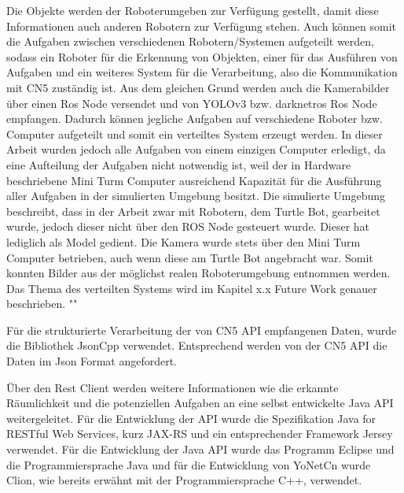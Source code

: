 Die Objekte werden der Roboterumgeben zur Verfügung gestellt, damit diese Informationen auch anderen Robotern zur Verfügung stehen. Auch können somit die Aufgaben zwischen verschiedenen Robotern/Systemen aufgeteilt werden, sodass ein Roboter für die Erkennung von Objekten, einer für das Ausführen von Aufgaben und ein weiteres System für die Verarbeitung, also die Kommunikation mit CN5 zuständig ist. Aus dem gleichen Grund werden auch die Kamerabilder über einen Ros Node versendet und von YOLOv3 bzw. darknetros Ros Node empfangen. Dadurch können jegliche Aufgaben auf verschiedene Roboter bzw. Computer aufgeteilt und somit ein verteiltes System erzeugt werden. In dieser Arbeit wurden jedoch alle Aufgaben von einem einzigen Computer erledigt, da eine Aufteilung der Aufgaben nicht notwendig ist, weil der in Hardware beschriebene Mini Turm Computer ausreichend Kapazität für die Ausführung aller Aufgaben in der simulierten Umgebung besitzt. Die simulierte Umgebung beschreibt, dass in der Arbeit zwar mit Robotern, dem Turtle Bot, gearbeitet wurde, jedoch dieser nicht über den ROS Node gesteuert wurde. Dieser hat lediglich als Model gedient. Die Kamera wurde stets über den Mini Turm Computer betrieben, auch wenn diese am Turtle Bot angebracht war. Somit konnten Bilder aus der möglichst realen Roboterumgebung entnommen werden. Das Thema des verteilten Systems wird im Kapitel x.x Future Work genauer beschrieben. 
""



Für die strukturierte Verarbeitung der von CN5 API empfangenen Daten, wurde die Bibliothek JsonCpp verwendet. Entsprechend werden von der CN5 API die Daten im Json Format angefordert. 

Über den Rest Client werden weitere Informationen wie die erkannte Räumlichkeit und die potenziellen Aufgaben an eine selbst entwickelte Java API weitergeleitet. Für die Entwicklung der API wurde die Spezifikation Java for RESTful Web Services, kurz JAX-RS und ein entsprechender Framework Jersey verwendet. 
Für die Entwicklung der Java API wurde das Programm Eclipse und die Programmiersprache Java und für die Entwicklung von YoNetCn wurde Clion, wie bereits erwähnt mit der Programmiersprache C++, verwendet. 


